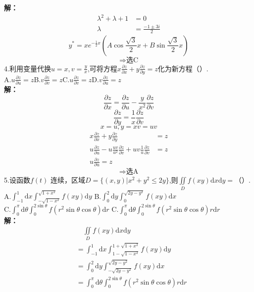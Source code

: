 \documentclass[a4paper]{article}
\begin{document}
\textbf{解：}
\begin{align*}
    \lambda^2 + \lambda +1 &=0\\
    \lambda&=\frac{-1 \pm 3i}{2}
\end{align*}
$$y^{*}=xe^{-\frac{1}{2}x}\left(A\cos \frac{\sqrt{3}}{2}x+B\sin \frac{\sqrt{3}}{2}x\right)$$
$$\Rightarrow \text{选C}$$
4.利用变量代换$u=x,v=\frac{y}{x}$,可将方程$x\frac{\partial z}{\partial x}+y\frac{\partial z}{\partial y}=z$化为新方程（\quad）.\\
A.$u\frac{\partial z}{\partial u}=z$\hfill B.$v\frac{\partial z}{\partial v}=z$\hfill C.$u\frac{\partial z}{\partial v}=z $\hfill  D.$v\frac{\partial z}{\partial u}=z$\\
\textbf{解：}
$$\frac{\partial z}{\partial x}=\frac{\partial z}{\partial u}-\frac{y}{x^2}\frac{\partial z}{\partial v}$$
$$\frac{\partial z}{\partial y}=\frac{1}{x}\frac{\partial z}{\partial v}$$
$$x=u,y=xv=uv$$
\begin{align*}
    x\frac{\partial z}{\partial x}+y\frac{\partial z}{\partial y}&=z\\
    u\frac{\partial z}{\partial u}-u\frac{uv}{u^2}\frac{\partial z}{\partial v}+uv\frac{1}{u}\frac{\partial z}{\partial v}&=z\\
    u\frac{\partial z}{\partial u}=z
\end{align*}
$$\Rightarrow \text{选A}$$
5.设函数$f(t)$ 连续，区域$D=\{\left. \left(x,y\right) \right| x^2+y^2\le 2y \}$,则$\iint\limits_{D}f(xy)\mathrm{d}x\mathrm{d}y=$（\quad）.\\
A.$\int_{-1}^{1}\mathrm{d}x\int_{-\sqrt{1-x^2}}^{\sqrt{1+x^2}}f(xy)\mathrm{d}y$\hfill
B.$\int_{0}^{2}\mathrm{d}y\int_{0}^{\sqrt{2y-y^2}}f(xy)\mathrm{d}x$\\
C.$\int_{0}^{\pi}\mathrm{d}\theta\int_{0}^{2\sin \theta}f(r^2\sin\theta\cos\theta)\mathrm{d}r$\hfill
C.$\int_{0}^{\pi}\mathrm{d}\theta\int_{0}^{2\sin \theta}f(r^2\sin\theta\cos\theta)r\mathrm{d}r$\\
\textbf{解：}
\begin{align*}
    &\quad \iint\limits_{D}f(xy)\mathrm{d}x\mathrm{d}y\\
    &= \int_{-1}^{1}\mathrm{d}x\int_{1-\sqrt{1-x^2}}^{1+\sqrt{1+x^2}}f(xy)\mathrm{d}y\\
    &= \int_{0}^{2}\mathrm{d}y\int_{-\sqrt{2y-y^2}}^{\sqrt{2y-y^2}}f(xy)\mathrm{d}x\\
    &= \int_{0}^{\pi}\mathrm{d}\theta\int_{0}^{2\sin \theta}f(r^2\sin\theta\cos\theta)r\mathrm{d}r
\end{align*}
\end{document}
